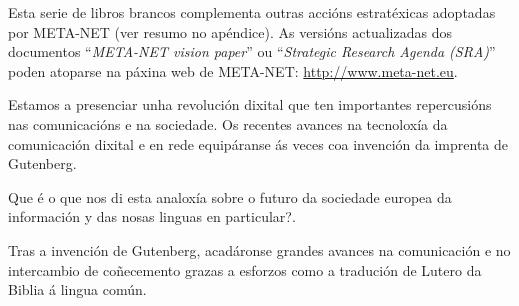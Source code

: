 \begin{multicols}{2}
Esta serie de libros brancos complementa outras accións estratéxicas adoptadas por META-NET (ver resumo no apéndice). As versións actualizadas dos documentos “\textit{META-NET vision paper}” \cite{Meta1} ou “\textit{Strategic Research Agenda (SRA)}” poden atoparse na páxina web de META-NET: \url{http://www.meta-net.eu}.
\end{multicols}

\clearpage



\begin{multicols}{2}

 Estamos a presenciar  unha revolución dixital que ten importantes repercusións nas comunicacións e na sociedade. Os recentes avances na tecnoloxía da comunicación dixital e en rede equipáranse ás veces coa invención da imprenta de Gutenberg.


 Que é o que nos di esta analoxía sobre o futuro da sociedade europea da información y das nosas linguas en particular?.

 Tras a invención de Gutenberg, acadáronse grandes avances na comunicación e no intercambio de coñecemento grazas a esforzos como a tradución de Lutero da Biblia á lingua común.


\end{multicols}

